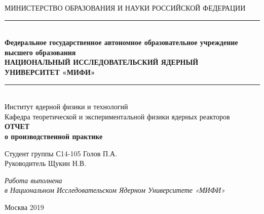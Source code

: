 \begin{center} 

\small МИНИСТЕРСТВО ОБРАЗОВАНИЯ И НАУКИ РОССИЙСКОЙ ФЕДЕРАЦИИ\\
\noindent\rule{13.9cm}{0.4pt}\\
\textbf{\footnotesize Федеральное государственное автономное образовательное учреждение высшего образования}\\[0.3cm]
\textbf{\normalsize НАЦИОНАЛЬНЫЙ ИССЛЕДОВАТЕЛЬСКИЙ ЯДЕРНЫЙ \\УНИВЕРСИТЕТ «МИФИ»}\\
\noindent\rule{13.9cm}{0.4pt}\\[0.6cm]

\normalsize Институт ядерной физики и технологий\\[0.6cm]
Кафедра теоретической и экспериментальной физики ядерных реакторов\\[2.4cm]

\textbf{\LARGE ОТЧЕТ}\\[0.6cm]
\textbf{\large о производственной практике}\\[3.6cm]
\end{center} 

\normalsize
Студент группы С14-105 \hspace{2.1cm} \underline{\hspace{4.2cm}} Голов П.А.\\[0.6cm]

Руководитель \hspace{4.5cm} \underline{\hspace{4.2cm}} Щукин Н.В.\\[1.2cm]

\begin{center} 
\textit{Работа выполнена\\
в Национальном Исследовательском Ядерном Университете «МИФИ»}

\vfill 


\large Москва 2019
\end{center} 

\thispagestyle{empty}
